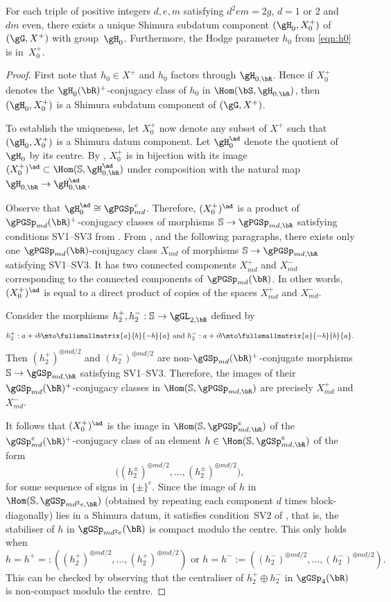 \begin{lemma}\label{unique-datum}
For each triple of positive integers $d,e,m$ satisfying $d^2em=2g$, $d=1$ or $2$ and $dm$ even, there exists a unique Shimura subdatum component $(\gH_0,X^+_0)$ of $(\gG,X^+)$ with group~$\gH_0$. Furthermore, the Hodge parameter $h_0$ from \eqref{eqn:h0} is in~$X_0^+$.
\end{lemma}

\begin{proof}
First note that $h_0 \in X^+$ and $h_0$ factors through $\gH_{0,\bR}$.
Hence if $X_0^+$ denotes the $\gH_0(\bR)^+$-conjugacy class of $h_0$ in $\Hom(\bS, \gH_{0,\bR})$, then $(\gH_0, X_0^+)$ is a Shimura subdatum component of $(\gG, X^+)$.

To establish the uniqueness, let $X_0^+$ now denote any subset of $X^+$ such that $(\gH_0, X_0^+)$ is a Shimura datum component.
Let $\gH_0^\ad$ denote the quotient of $\gH_0$ by its centre.
By \cite[Prop.\,5.7(a)]{Mil05}, $X_0^+$ is in bijection with its image $(X^+_0)^{\ad}\subset\Hom(\mathbb{S},\gH^\ad_{0,\bR})$ under composition with the natural map $\gH_{0,\bR}\to\gH^{\ad}_{0,\bR}$.

Observe that $\gH^\ad_0\cong\gPGSp_{md}^e$. Therefore, $(X^+_0)^{\ad}$ is a product of $\gPGSp_{md}(\bR)^+$-conjugacy classes of morphisms $\mathbb{S}\to\gPGSp_{md,\bR}$ satisfying conditions SV1--SV3 from \cite[\S 4]{Mil05}. From \cite[Prop 1.24]{Mil05}, and the following paragraphs, there exists only one $\gPGSp_{md}(\bR)$-conjugacy class $X_{md}$ of morphisms $\mathbb{S}\to\gPGSp_{md,\bR}$ satisfying SV1--SV3. It has two connected components $X^+_{md}$ and $X^-_{md}$ corresponding to the connected components of $\gPGSp_{md}(\bR)$. In other words, $(X^+_0)^{\ad}$ is equal to a direct product of copies of the spaces $X^+_{md}$ and $X^-_{md}$.

Consider the morphisms $h^+_2,h^-_2:\mathbb{S}\to\gGL_{2,\bR}$ defined by
\[h^+_2:a+ib\mto\fullsmallmatrix{a}{b}{-b}{a}\text{ and } h^-_2:a+ib\mto\fullsmallmatrix{a}{-b}{b}{a}.\]
Then $(h^+_2)^{\oplus md/2}$ and $(h^-_2)^{\oplus md/2}$ are non-$\gGSp_{md}(\bR)^+$-conjugate morphisms $\mathbb{S}\to\gGSp_{md,\bR}$ satisfying SV1--SV3. Therefore, the images of their $\gGSp_{md}(\bR)^+$-conjugacy classes in $\Hom(\mathbb{S},\gPGSp_{md,\bR})$ are precisely $X^+_{md}$ and $X^-_{md}$.

It follows that $(X^+_0)^{\ad}$ is the image in $\Hom(\mathbb{S},\gPGSp^e_{md,\bR})$ of the $\gGSp_{md}^e(\bR)^+$-conjugacy class of an element $h\in\Hom(\mathbb{S},\gGSp^e_{md,\bR})$ of the form
\[\bigl( (h^{\pm}_2)^{\oplus md/2}, \dotsc, (h^{\pm}_2)^{\oplus md/2} \bigr),\]
for some sequence of signs in $\{\pm\}^e$.
Since the image of $h$ in $\Hom(\mathbb{S},\gGSp_{md^2e,\bR})$ (obtained by repeating each component $d$ times block-diagonally) lies in a Shimura datum, it satisfies condition~SV2 of \cite{Mil05}, that is, the stabiliser of $h$ in $\gGSp_{md^2e}(\bR)$ is compact modulo the centre. This only holds when
\[
h=h^+=:((h^+_2)^{\oplus md/2}, \dotsc, (h^+_2)^{\oplus md/2}) \text{ or } h=h^-:=((h^-_2)^{\oplus md/2}, \dotsc, (h^-_2)^{\oplus md/2}).\]
This can be checked by observing that the centraliser of $h^+_2 \oplus h^-_2$ in $\gGSp_4(\bR)$ is non-compact modulo the centre.


\end{proof}
